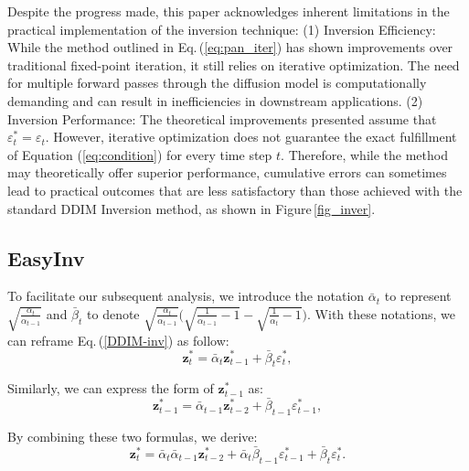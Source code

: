 \documentclass[letterpaper]{article} \usepackage{aaai25}  \usepackage{times}  \usepackage{helvet}  \usepackage{courier}  \usepackage[hyphens]{url}  \usepackage{graphicx} \urlstyle{rm} \def\UrlFont{\rm}  \usepackage{natbib}  \usepackage{caption} \frenchspacing  \setlength{\pdfpagewidth}{8.5in} \setlength{\pdfpageheight}{11in} \usepackage{algorithm}
\begin{document}
Despite the progress made, this paper acknowledges inherent limitations in the practical implementation of the inversion technique:
(1) Inversion Efficiency: While the method outlined in Eq.\,(\ref{eq:pan_iter}) has shown improvements over traditional fixed-point iteration, it still relies on iterative optimization. The need for multiple forward passes through the diffusion model is computationally demanding and can result in inefficiencies in downstream applications.
(2) Inversion Performance: The theoretical improvements presented assume that \(\varepsilon^*_t = \varepsilon_t\). However, iterative optimization does not guarantee the exact fulfillment of Equation (\ref{eq:condition}) for every time step \( t \). Therefore, while the method may theoretically offer superior performance, cumulative errors can sometimes lead to practical outcomes that are less satisfactory than those achieved with the standard DDIM Inversion method, as shown in Figure\,\ref{fig_inver}.



\subsection{EasyInv}
\label{sec:ours}

To facilitate our subsequent analysis, we introduce the notation $\bar\alpha_{t}$ to represent $\sqrt{\frac{\alpha_{t}}{\alpha_{t-1}}}$ and $\bar\beta_{t}$ to denote $\sqrt{\frac{\alpha_{t}}{\alpha_{t-1}}}\Big(\sqrt{\frac{1}{\alpha_{t-1}} - 1} - \sqrt{\frac{1}{\alpha_t} - 1} \Big)$. With these notations, we can reframe Eq.\,(\ref{DDIM-inv}) as follow:
\begin{equation}\label{eq:x_t}
\mathbf{z}^*_{t}=\bar\alpha_{t}\mathbf{z}^*_{t-1} + \bar\beta_{t}\varepsilon^*_{t},
\end{equation}



Similarly, we can express the form of $\mathbf{z}^*_{t-1}$ as:
\begin{equation}\label{eq:x_t-1}
\mathbf{z}^*_{t-1}=\bar\alpha_{t-1}\mathbf{z}^*_{t-2} + \bar\beta_{t-1}\varepsilon^*_{t-1},
\end{equation}


By combining these two formulas, we derive:
\begin{equation}\label{eq:reformed_x_t}
\mathbf{z}^*_{t}=\bar\alpha_{t}\bar\alpha_{t-1}\mathbf{z}^*_{t-2} + \bar\alpha_{t}\bar\beta_{t-1}\varepsilon^*_{t-1} + \bar\beta_{t}\varepsilon^*_{t}.
\end{equation}
\end{document}
